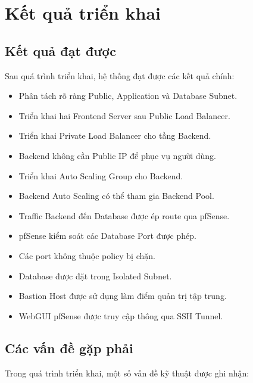 \documentclass[12pt, a4paper]{article}
\begin{document}
\section{Kết quả triển khai}

\subsection{Kết quả đạt được}

Sau quá trình triển khai, hệ thống đạt được các kết quả chính:

\begin{itemize}
    \item Phân tách rõ ràng Public, Application và Database Subnet.
    \item Triển khai hai Frontend Server sau Public Load Balancer.
    \item Triển khai Private Load Balancer cho tầng Backend.
    \item Backend không cần Public IP để phục vụ người dùng.
    \item Triển khai Auto Scaling Group cho Backend.
    \item Backend Auto Scaling có thể tham gia Backend Pool.
    \item Traffic Backend đến Database được ép route qua pfSense.
    \item pfSense kiểm soát các Database Port được phép.
    \item Các port không thuộc policy bị chặn.
    \item Database được đặt trong Isolated Subnet.
    \item Bastion Host được sử dụng làm điểm quản trị tập trung.
    \item WebGUI pfSense được truy cập thông qua SSH Tunnel.
\end{itemize}

\subsection{Các vấn đề gặp phải}

Trong quá trình triển khai, một số vấn đề kỹ thuật được ghi nhận:
\end{document}
